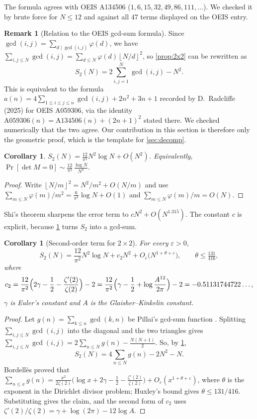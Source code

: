 \documentclass[11pt]{article}
\newtheorem{corollary}[theorem]{Corollary}
\theoremstyle{definition}
\newtheorem{remark}[theorem]{Remark}
\newcommand{\floor}[1]{\left\lfloor #1 \right\rfloor}
\begin{document}
The formula agrees with OEIS A134506 ($1,6,15,32,49,86,111,\dots$). We checked it by brute force for $N\le12$ and against all $47$ terms displayed on the OEIS entry.

\begin{remark}[Relation to the OEIS gcd-sum formula]\label{rem:gcd}
Since $\gcd(i,j)=\sum_{d\mid\gcd(i,j)}\varphi(d)$, we have $\sum_{i,j\le N}\gcd(i,j)=\sum_{d\le N}\varphi(d)\floor{N/d}^2$, so \cref{prop:2x2} can be rewritten as
\[
S_2(N)=2\sum_{i,j=1}^{N}\gcd(i,j)-N^2 .
\]
This is equivalent to the formula $a(n)=4\sum_{1\le i\le j\le n}\gcd(i,j)+2n^2+3n+1$ recorded by D.~Radcliffe (2025) for OEIS A059306, via the identity $\mathrm{A059306}(n)=\mathrm{A134506}(n)+(2n+1)^2$ stated there. We checked numerically that the two agree. Our contribution in this section is therefore only the geometric proof, which is the template for \cref{sec:decomp}.
\end{remark}

\begin{corollary}\label{cor:2x2asymp}
$S_2(N)=\frac{12}{\pi^2}N^2\log N+O(N^2)$. Equivalently, $\Pr[\det M=0]\sim \frac{12}{\pi^2}\,\frac{\log N}{N^2}$.
\end{corollary}

\begin{proof}
Write $\floor{N/m}^2=N^2/m^2+O(N/m)$ and use $\sum_{m\le N}\varphi(m)/m^2=\frac{6}{\pi^2}\log N+O(1)$ and $\sum_{m\le N}\varphi(m)/m=O(N)$.
\end{proof}

Shi's theorem \cite{Shi} sharpens the error term to $cN^2+O(N^{1.315})$. The constant $c$ is explicit, because \cref{rem:gcd} turns $S_2$ into a gcd-sum.

\begin{corollary}[Second-order term for $2\times2$]\label{cor:c2}
For every $\varepsilon>0$,
\[
S_2(N)=\frac{12}{\pi^2}N^2\log N+c_2N^2+O_\varepsilon\bigl(N^{1+\theta+\varepsilon}\bigr),\qquad \theta\le\tfrac{131}{416},
\]
where
\[
c_2=\frac{12}{\pi^2}\Bigl(2\gamma-\frac12-\frac{\zeta'(2)}{\zeta(2)}\Bigr)-2
=\frac{12}{\pi^2}\Bigl(\gamma-\frac12+\log\frac{A^{12}}{2\pi}\Bigr)-2=-0.51131744722\ldots,
\]
$\gamma$ is Euler's constant and $A$ is the Glaisher--Kinkelin constant.
\end{corollary}

\begin{proof}
Let $g(n)=\sum_{k\le n}\gcd(k,n)$ be Pillai's gcd-sum function \cite{Broughan}. Splitting $\sum_{i,j\le N}\gcd(i,j)$ into the diagonal and the two triangles gives $\sum_{i,j\le N}\gcd(i,j)=2\sum_{n\le N}g(n)-\frac{N(N+1)}{2}$. So, by \cref{rem:gcd},
\[
S_2(N)=4\sum_{n\le N}g(n)-2N^2-N.
\]
Bordellès \cite{Bordelles} proved that $\sum_{n\le x}g(n)=\frac{x^2}{2\zeta(2)}\bigl(\log x+2\gamma-\frac12-\frac{\zeta'(2)}{\zeta(2)}\bigr)+O_\varepsilon(x^{1+\theta+\varepsilon})$, where $\theta$ is the exponent in the Dirichlet divisor problem; Huxley's bound gives $\theta\le131/416$. Substituting gives the claim, and the second form of $c_2$ uses $\zeta'(2)/\zeta(2)=\gamma+\log(2\pi)-12\log A$.
\end{proof}
\end{document}
